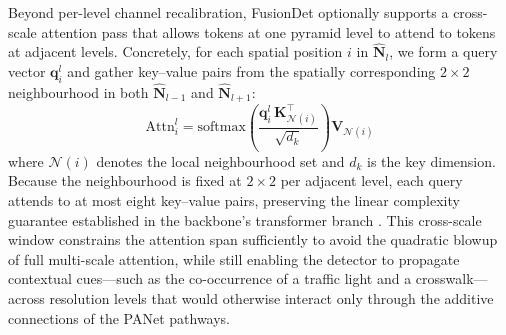 Beyond per-level channel recalibration, FusionDet optionally
supports a cross-scale attention pass that allows tokens at
one pyramid level to attend to tokens at adjacent levels.
Concretely, for each spatial position $i$ in
$\hat{\mathbf{N}}_{l}$, we form a query vector
$\mathbf{q}_{i}^{l}$ and gather key--value pairs from the
spatially corresponding $2\times2$ neighbourhood in both
$\hat{\mathbf{N}}_{l-1}$ and $\hat{\mathbf{N}}_{l+1}$:
\begin{equation}
    \text{Attn}_{i}^{l} = \text{softmax}\!\!\left(
        \frac{\mathbf{q}_{i}^{l}\,
              \mathbf{K}_{\mathcal{N}(i)}^{\top}}
             {\sqrt{d_{k}}}
    \right) \mathbf{V}_{\mathcal{N}(i)}
    \label{eq:cross_attn}
\end{equation}
where $\mathcal{N}(i)$ denotes the local neighbourhood set and
$d_{k}$ is the key dimension. Because the neighbourhood is
fixed at $2\times2$ per adjacent level, each query attends to
at most eight key--value pairs, preserving the linear
complexity guarantee established in the backbone's transformer
branch \cite{katharopoulos2020transformers}. This cross-scale
window constrains the attention span sufficiently to avoid
the quadratic blowup of full multi-scale attention, while
still enabling the detector to propagate contextual cues---such
as the co-occurrence of a traffic light and a
crosswalk---across resolution levels that would otherwise
interact only through the additive connections of the PANet
pathways.
